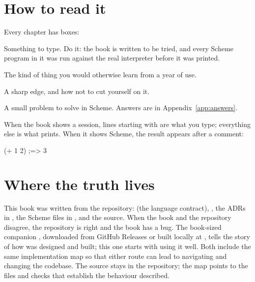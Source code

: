 \section*{How to read it}

Every chapter has boxes:

\begin{tryit}
Something to type. Do it: the book is written to be tried, and every Scheme
program in it was run against the real interpreter before it was printed.
\end{tryit}

\begin{tip}
The kind of thing you would otherwise learn from a year of use.
\end{tip}

\begin{careful}
A sharp edge, and how not to cut yourself on it.
\end{careful}

\begin{puzzle}
A small problem to solve in Scheme. Answers are in
Appendix~\ref{app:answers}.
\end{puzzle}

When the book shows a session, lines starting with  are what you
type; everything else is what \nodwyn{} prints. When it shows Scheme, the
result appears after a \code{;=>} comment:

\begin{scm}
(+ 1 2)          ;=> 3
\end{scm}

\section*{Where the truth lives}

This book was written from the repository:  (the
language contract), , the ADRs in , the
Scheme files in , and the source. When the book and the
repository disagree, the repository is right and the book has a bug. The
book-sized companion , downloaded from GitHub Releases or
built locally at , tells the story of how
\nodwyn{} was designed and built; this one starts with using it well.
Both include the same implementation map so that either route can lead
to navigating and changing the codebase. The source stays in the repository;
the map points to the files and checks that establish the behaviour described.
